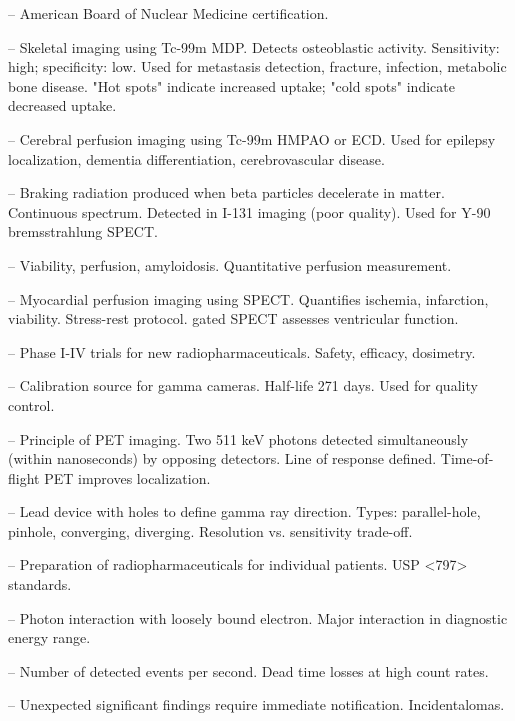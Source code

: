 -- American Board of Nuclear Medicine certification.

-- Skeletal imaging using Tc-99m MDP. Detects osteoblastic activity. Sensitivity: high; specificity: low. Used for metastasis detection, fracture, infection, metabolic bone disease. "Hot spots" indicate increased uptake; "cold spots" indicate decreased uptake.

-- Cerebral perfusion imaging using Tc-99m HMPAO or ECD. Used for epilepsy localization, dementia differentiation, cerebrovascular disease.

-- Braking radiation produced when beta particles decelerate in matter. Continuous spectrum. Detected in I-131 imaging (poor quality). Used for Y-90 bremsstrahlung SPECT.

-- Viability, perfusion, amyloidosis. Quantitative perfusion measurement.

-- Myocardial perfusion imaging using SPECT. Quantifies ischemia, infarction, viability. Stress-rest protocol. gated SPECT assesses ventricular function.

-- Phase I-IV trials for new radiopharmaceuticals. Safety, efficacy, dosimetry.

-- Calibration source for gamma cameras. Half-life 271 days. Used for quality control.

-- Principle of PET imaging. Two 511 keV photons detected simultaneously (within nanoseconds) by opposing detectors. Line of response defined. Time-of-flight PET improves localization.


-- Lead device with holes to define gamma ray direction. Types: parallel-hole, pinhole, converging, diverging. Resolution vs. sensitivity trade-off.

-- Preparation of radiopharmaceuticals for individual patients. USP <797> standards.

-- Photon interaction with loosely bound electron. Major interaction in diagnostic energy range.

-- Number of detected events per second. Dead time losses at high count rates.

-- Unexpected significant findings require immediate notification. Incidentalomas.

